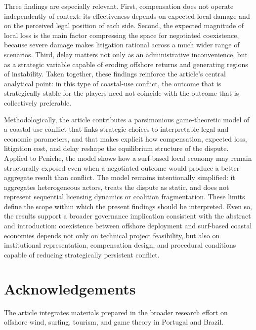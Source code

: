 \documentclass[final,times,authoryear]{elsarticle}
\begin{document}
Three findings are especially relevant. First, compensation does not operate independently of context: its effectiveness depends on expected local damage and on the perceived legal position of each side. Second, the expected magnitude of local loss is the main factor compressing the space for negotiated coexistence, because severe damage makes litigation rational across a much wider range of scenarios. Third, delay matters not only as an administrative inconvenience, but as a strategic variable capable of eroding offshore returns and generating regions of instability. Taken together, these findings reinforce the article's central analytical point: in this type of coastal-use conflict, the outcome that is strategically stable for the players need not coincide with the outcome that is collectively preferable.

Methodologically, the article contributes a parsimonious game-theoretic model of a coastal-use conflict that links strategic choices to interpretable legal and economic parameters, and that makes explicit how compensation, expected loss, litigation cost, and delay reshape the equilibrium structure of the dispute. Applied to Peniche, the model shows how a surf-based local economy may remain structurally exposed even when a negotiated outcome would produce a better aggregate result than conflict. The model remains intentionally simplified: it aggregates heterogeneous actors, treats the dispute as static, and does not represent sequential licensing dynamics or coalition fragmentation. These limits define the scope within which the present findings should be interpreted. Even so, the results support a broader governance implication consistent with the abstract and introduction: coexistence between offshore deployment and surf-based coastal economies depends not only on technical project feasibility, but also on institutional representation, compensation design, and procedural conditions capable of reducing strategically persistent conflict.


\section*{Acknowledgements}

The article integrates materials prepared in the broader research effort on offshore wind, surfing, tourism, and game theory in Portugal and Brazil.



\end{document}
